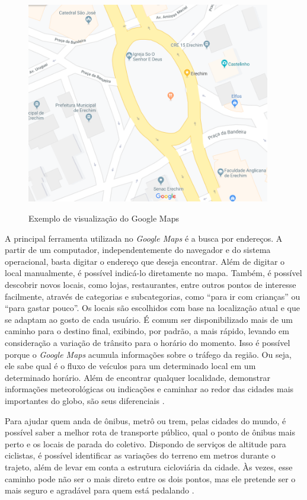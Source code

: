 \begin{figure}[H]
    \centering
    \caption{Exemplo de visualização do Google Maps}
    \includegraphics[width=0.95\textwidth]{./dados/figuras/fig4}
    \label{fig:figura-googlemaps}
\end{figure}

A principal ferramenta utilizada no \textit{Google Maps} é a busca por endereços. A partir de um computador, independentemente do navegador e do sistema operacional, basta digitar o endereço que deseja encontrar. Além de digitar o local manualmente, é possível indicá-lo diretamente no mapa. Também, é possível descobrir novos locais, como lojas, restaurantes, entre outros pontos de interesse facilmente, através de categorias e subcategorias, como “para ir com crianças” ou “para gastar pouco”. Os locais são escolhidos com base na localização atual e que se adaptam ao gosto de cada usuário. É comum ser disponibilizado mais de um caminho para o destino final, exibindo, por padrão, a mais rápido, levando em consideração a variação de trânsito para o horário do momento. Isso é possível porque o \textit{Google Maps} acumula informações sobre o tráfego da região. Ou seja, ele sabe qual é o fluxo de veículos para um determinado local em um determinado horário. Além de encontrar qualquer localidade, demonstrar informações meteorológicas ou indicações e caminhar ao redor das cidades mais importantes do globo, são seus diferenciais \cite{google:2019}.

\newpage
Para ajudar quem anda de ônibus, metrô ou trem, pelas cidades do mundo, é possível saber a melhor rota de transporte público, qual o ponto de ônibus mais perto e os locais de parada do coletivo. Dispondo de serviços de altitude para ciclistas, é possível identificar as variações do terreno em metros durante o trajeto, além de levar em conta a estrutura cicloviária da cidade. Às vezes, esse caminho pode não ser o mais direto entre os dois pontos, mas ele pretende ser o mais seguro e agradável para quem está pedalando \cite{google:2019}.

